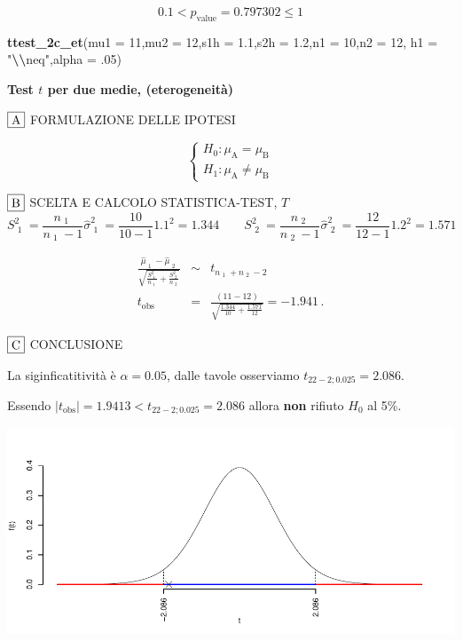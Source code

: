 \documentclass[
  11pt,
]{book}
\newenvironment{Shaded}{\begin{snugshade}}{\end{snugshade}}
\newcommand{\AttributeTok}[1]{\textcolor[rgb]{0.13,0.29,0.53}{#1}}
\newcommand{\DecValTok}[1]{\textcolor[rgb]{0.00,0.00,0.81}{#1}}
\newcommand{\FloatTok}[1]{\textcolor[rgb]{0.00,0.00,0.81}{#1}}
\newcommand{\FunctionTok}[1]{\textcolor[rgb]{0.13,0.29,0.53}{\textbf{#1}}}
\newcommand{\NormalTok}[1]{#1}
\newcommand{\SpecialCharTok}[1]{\textcolor[rgb]{0.81,0.36,0.00}{\textbf{#1}}}
\newcommand{\StringTok}[1]{\textcolor[rgb]{0.31,0.60,0.02}{#1}}
\theoremstyle{mytheoremstyle}
\theoremstyle{mydefstyle}
\begin{document}
\[
 0.1 < p_\text{value}= 0.797302 \leq 1 
\]

\begin{Shaded}
\begin{Highlighting}[]
\FunctionTok{ttest\_2c\_et}\NormalTok{(}\AttributeTok{mu1 =} \DecValTok{11}\NormalTok{,}\AttributeTok{mu2 =} \DecValTok{12}\NormalTok{,}\AttributeTok{s1h =} \FloatTok{1.1}\NormalTok{,}\AttributeTok{s2h =} \FloatTok{1.2}\NormalTok{,}\AttributeTok{n1 =} \DecValTok{10}\NormalTok{,}\AttributeTok{n2 =} \DecValTok{12}\NormalTok{,}
                \AttributeTok{h1 =} \StringTok{"}\SpecialCharTok{\textbackslash{}\textbackslash{}}\StringTok{neq"}\NormalTok{,}\AttributeTok{alpha =}\NormalTok{ .}\DecValTok{05}\NormalTok{)}
\end{Highlighting}
\end{Shaded}

\textbf{Test \(t\) per due medie, (eterogeneità)}

\(\fbox{A}\) FORMULAZIONE DELLE IPOTESI

\[\begin{cases}
   H_0: \mu_\text{A} = \mu_\text{B} \\
   H_1: \mu_\text{A} \neq \mu_\text{B} 
   \end{cases}\]

\(\fbox{B}\) SCELTA E CALCOLO STATISTICA-TEST, \(T\)
\[
     S^2_\text{ 1 }=\frac{n_\text{ 1 }}{n_\text{ 1 }-1}\hat\sigma^2_\text{ 1 }=\frac{ 10 }{ 10 -1} 1.1 ^2= 1.344  \qquad
     S^2_\text{ 2 }=\frac{n_\text{ 2 }}{n_\text{ 2 }-1}\hat\sigma^2_\text{ 2 }=\frac{ 12 }{ 12 -1} 1.2 ^2= 1.571 
   \]

\begin{eqnarray*}
   \frac{\hat\mu_\text{ 1 } - \hat\mu_\text{ 2 }}
   {\sqrt{\frac {S^2_\text{ 1 }}{n_\text{ 1 }}+\frac {S^2_\text{ 2 }}{n_\text{ 2 }}}}&\sim&t_{n_\text{ 1 }+n_\text{ 2 }-2}\\
   t_{\text{obs}}
   &=& \frac{ ( 11 -  12 )} {\sqrt{\frac{ 1.344 }{ 10 }+\frac{ 1.571 }{ 12 }}}
   =   -1.941 \, .
   \end{eqnarray*}

\(\fbox{C}\) CONCLUSIONE

La siginficatitività è \(\alpha=0.05\), dalle tavole osserviamo \(t_{22-2;0.025}=2.086\).

Essendo \(|t_\text{obs}|=1.9413<t_{22-2;0.025}=2.086\) allora \textbf{non} rifiuto \(H_0\) al 5\%.

\begin{center}\includegraphics{Appunti_di_Statistica_2025_files/figure-latex/25-test-functions-10-11} \end{center}
\end{document}

